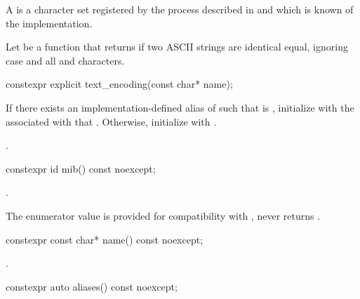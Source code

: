 \documentclass{wg21}
\begin{document}
\begin{addedblock}
    
\pnum A  is a character set registered by the process described in \cite{rfc2978} and which is known of the implementation.

\pnum Let  be a function that returns  if two ASCII strings are identical equal, ignoring case and all \tcode{-} and  \tcode{_} characters.

\pnum 
    
\begin{itemdecl}
constexpr explicit text_encoding(const char* name);
\end{itemdecl}

\begin{itemdescr}
    \effects
    If there exists an implementation-defined alias  of  such that  is , initialize
     with the  associated with that . Otherwise, initialize  with .
 

    \ensures {}.
\end{itemdescr}


\begin{itemdecl}
constexpr id mib() const noexcept;
\end{itemdecl}

\begin{itemdescr}
\returns {}.

\begin{note}
	The enumerator value  is provided for compatibility with \cite{rfc3808}, 
	 never returns .
\end{note}

\end{itemdescr}

\begin{itemdecl}
constexpr const char* name() const noexcept;
\end{itemdecl}

\begin{itemdescr}
\returns {}.
\end{itemdescr}


\begin{itemdecl}
constexpr auto aliases() const noexcept;
\end{itemdecl}


\end{addedblock}
\end{document}
